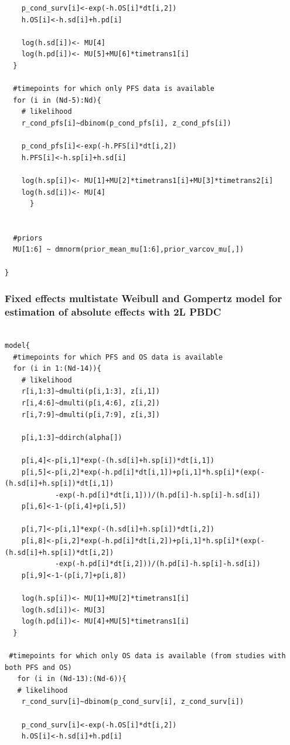 \documentclass[11pt,final,fleqn]{article}\usepackage[]{graphicx}\usepackage[]{color}
\theoremstyle{plain}
\begin{document}
\begin{appendices}
\begin{verbatim}
    p_cond_surv[i]<-exp(-h.OS[i]*dt[i,2])
    h.OS[i]<-h.sd[i]+h.pd[i]
    
    log(h.sd[i])<- MU[4] 
    log(h.pd[i])<- MU[5]+MU[6]*timetrans1[i]
  }
    
  #timepoints for which only PFS data is available 
  for (i in (Nd-5):Nd){
    # likelihood
    r_cond_pfs[i]~dbinom(p_cond_pfs[i], z_cond_pfs[i]) 
    
    p_cond_pfs[i]<-exp(-h.PFS[i]*dt[i,2])
    h.PFS[i]<-h.sp[i]+h.sd[i]
    
    log(h.sp[i])<- MU[1]+MU[2]*timetrans1[i]+MU[3]*timetrans2[i] 
    log(h.sd[i])<- MU[4] 
      }
  
 
  #priors
  MU[1:6] ~ dmnorm(prior_mean_mu[1:6],prior_varcov_mu[,]) 
  
}

\end{verbatim}

\subsubsection{Fixed effects multistate Weibull and Gompertz model for estimation of absolute effects with 2L PBDC} 
\begin{verbatim} 

model{
  #timepoints for which PFS and OS data is available
  for (i in 1:(Nd-14)){
    # likelihood
    r[i,1:3]~dmulti(p[i,1:3], z[i,1]) 
    r[i,4:6]~dmulti(p[i,4:6], z[i,2]) 
    r[i,7:9]~dmulti(p[i,7:9], z[i,3]) 
    
    p[i,1:3]~ddirch(alpha[])
    
    p[i,4]<-p[i,1]*exp(-(h.sd[i]+h.sp[i])*dt[i,1])
    p[i,5]<-p[i,2]*exp(-h.pd[i]*dt[i,1])+p[i,1]*h.sp[i]*(exp(-(h.sd[i]+h.sp[i])*dt[i,1])
    		-exp(-h.pd[i]*dt[i,1]))/(h.pd[i]-h.sp[i]-h.sd[i])
    p[i,6]<-1-(p[i,4]+p[i,5])
    
    p[i,7]<-p[i,1]*exp(-(h.sd[i]+h.sp[i])*dt[i,2])
    p[i,8]<-p[i,2]*exp(-h.pd[i]*dt[i,2])+p[i,1]*h.sp[i]*(exp(-(h.sd[i]+h.sp[i])*dt[i,2])
    		-exp(-h.pd[i]*dt[i,2]))/(h.pd[i]-h.sp[i]-h.sd[i])
    p[i,9]<-1-(p[i,7]+p[i,8])
    
    log(h.sp[i])<- MU[1]+MU[2]*timetrans1[i] 
    log(h.sd[i])<- MU[3]
    log(h.pd[i])<- MU[4]+MU[5]*timetrans1[i]
  }
  
 #timepoints for which only OS data is available (from studies with both PFS and OS)
   for (i in (Nd-13):(Nd-6)){
   # likelihood
    r_cond_surv[i]~dbinom(p_cond_surv[i], z_cond_surv[i]) 
    
    p_cond_surv[i]<-exp(-h.OS[i]*dt[i,2])
    h.OS[i]<-h.sd[i]+h.pd[i]
    

\end{verbatim}
\end{appendices}
\end{document}
